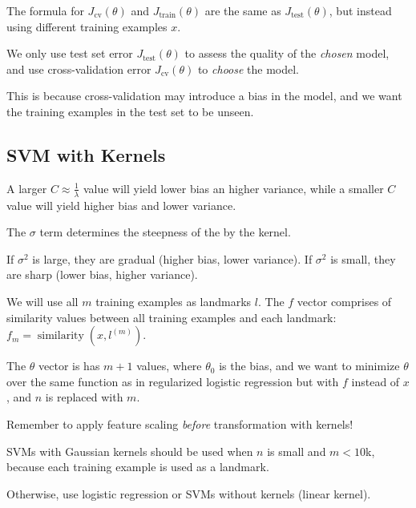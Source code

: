 The formula for $J_{\text{cv}}(\theta)$ and $J_{\text{train}}(\theta)$ are the same
as $J_{\text{test}}(\theta)$, but instead using different training examples $x$.

We only use test set error $J_{\text{test}}(\theta)$ to assess the quality of the \emph{chosen}
model, and use cross-validation error $J_{\text{cv}}(\theta)$ to \emph{choose} the model.

This is because cross-validation may introduce a bias in the model, and we want
the training examples in the test set to be unseen.

\subsection{SVM with Kernels}

A larger $C \approx \frac{1}{\lambda}$ value will yield lower bias an higher variance,
while a smaller $C$ value will yield higher bias and lower variance.

The $\sigma$ term determines the steepness of the  by the kernel.

If $\sigma^2$ is large, they are gradual (higher bias, lower variance).
If $\sigma^2$ is small, they are sharp (lower bias, higher variance).

We will use all $m$ training examples as landmarks $l$. The $f$ vector comprises
of similarity values between all training examples and each landmark:
$f_m = \operatorname{similarity}(x, l^{(m)})$.

The $\theta$ vector is has $m + 1$ values, where $\theta_0$ is the bias, and we want to
minimize $\theta$ over the same function as in regularized logistic regression but
with $f$ instead of $x$, and $n$ is replaced with $m$.

Remember to apply feature scaling \emph{before} transformation with kernels!

SVMs with Gaussian kernels should be used when $n$ is small and $m < 10$k,
because each training example is used as a landmark.

Otherwise, use logistic regression or SVMs without kernels (linear kernel).